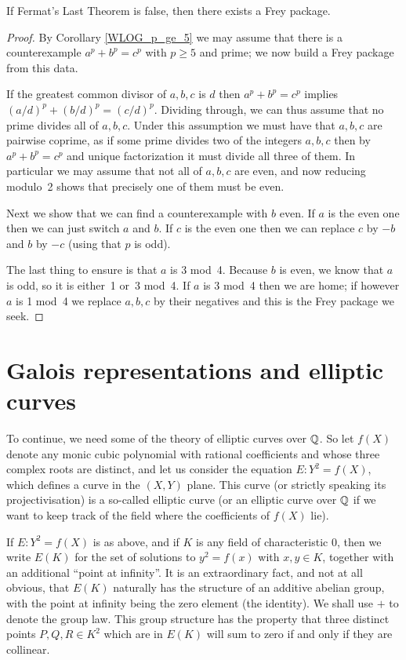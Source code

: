\begin{lemma}\label{Frey_package_of_FLT_counterex}\leanok
  If Fermat's Last Theorem is false, then there exists a Frey package.
\end{lemma}
\begin{proof} By Corollary \ref{WLOG_p_ge_5} we may assume that there is a counterexample $a^p+b^p=c^p$ with $p\geq 5$ and prime; we now build a Frey package from this data.
  
  If the greatest common divisor of $a,b,c$ is $d$ then $a^p+b^p=c^p$ implies $(a/d)^p+(b/d)^p=(c/d)^p$. Dividing through, we can thus assume that no prime divides all of $a,b,c$. Under this assumption we must have that $a,b,c$ are pairwise coprime, as if some prime divides two of the integers $a,b,c$ then by $a^p+b^p=c^p$ and unique factorization it must divide all three of them. In particular we may assume that not all of $a,b,c$ are even, and now reducing modulo~2 shows that precisely one of them must be even. 
  
  Next we show that we can find a counterexample with $b$ even. If $a$ is the even one then we can just switch $a$ and $b$. If $c$ is the even one then we can replace $c$ by $-b$ and $b$ by $-c$ (using that $p$ is odd).

  The last thing to ensure is that $a$ is 3 mod~4. Because $b$ is even, we know that $a$ is odd, so it is either~1 or~3 mod~4. If $a$ is 3 mod~4 then we are home; if however $a$ is 1 mod~4 we replace $a,b,c$ by their negatives and this is the Frey package we seek.
\end{proof}

\section{Galois representations and elliptic curves}\label{twopointfour}

To continue, we need some of the theory of elliptic curves over $\mathbb{Q}$. So let $f(X)$ denote any monic cubic polynomial with rational coefficients and whose three complex roots are distinct, and let us consider the equation $E:Y^2=f(X)$, which defines a curve in the $(X,Y)$ plane. This curve (or strictly speaking its projectivisation) is a so-called elliptic curve (or an elliptic curve over $\mathbb{Q}$ if we want to keep track of the field where the coefficients of $f(X)$ lie). 

If $E:Y^2=f(X)$ is as above, and if $K$ is any field of characteristic 0, then we write $E(K)$ for the set of solutions to $y^2=f(x)$ with $x,y\in K$, together with an additional ``point at infinity''. It is an extraordinary fact, and not at all obvious, that $E(K)$ naturally has the structure of an additive abelian group, with the point at infinity being the zero element (the identity). We shall use $+$ to denote the group law. This group structure has the property that three distinct points $P,Q,R\in K^2$ which are in $E(K)$ will sum to zero if and only if they are collinear.

